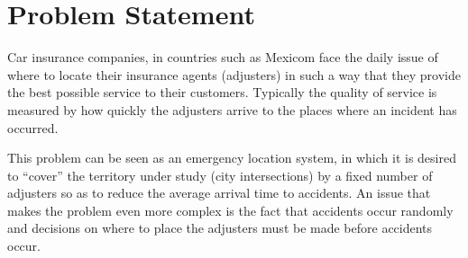 \section{Problem Statement}
Car insurance companies,
in countries such as Mexicom
face the daily issue
of where to locate
their insurance agents (adjusters)
in such a way
that they provide
the best possible service
to their customers.
Typically
the quality of service
is measured
by how quickly
the adjusters arrive
to the places
where an incident has occurred.

This problem
can be seen
as an emergency location system, %
in which
it is desired to ``cover''
the territory under study
(city intersections)
by a fixed number of adjusters
so as to reduce
the average arrival time to accidents.
An issue
that makes the problem
even more complex
is the fact
that accidents occur randomly
and decisions
on where to place the adjusters
must be made before
accidents occur.
